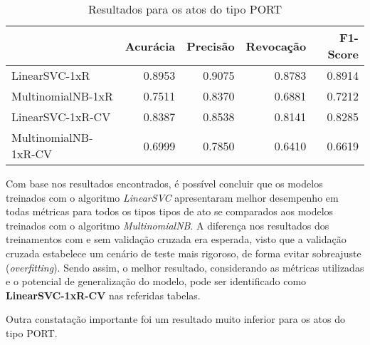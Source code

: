 \begin{table}[h]
\caption{Resultados para os atos do tipo PORT}
\label{tab:resultados-port}
	\begin{center}
	\begin{tabular}{lrrrr}
		\toprule
		{} &  Acurácia &  Precisão &  Revocação &      F1-Score \\
		\midrule
		LinearSVC-1xR        &    0.8953 &    0.9075 &     0.8783 &  0.8914 \\
		MultinomialNB-1xR    &    0.7511 &    0.8370 &     0.6881 &  0.7212 \\
		LinearSVC-1xR-CV     &    0.8387 &    0.8538 &     0.8141 &  0.8285 \\
		MultinomialNB-1xR-CV &    0.6999 &    0.7850 &     0.6410 &  0.6619 \\
		\bottomrule
	\end{tabular}
	\end{center}		
\end{table}

Com base nos resultados encontrados, é possível concluir que os modelos treinados com o algoritmo \textit{LinearSVC} apresentaram melhor desempenho em todas métricas para todos os tipos tipos de ato se comparados aos modelos treinados com o algoritmo \textit{MultinomialNB}. A diferença nos resultados dos treinamentos com e sem validação cruzada era esperada, visto que a validação cruzada estabelece um cenário de teste mais rigoroso, de forma evitar sobreajuste (\textit{overfitting}). Sendo assim, o melhor resultado, considerando as métricas utilizadas e o potencial de generalização do modelo, pode ser identificado como \textbf{LinearSVC-1xR-CV} nas referidas tabelas. 

Outra constatação importante foi um resultado muito inferior para os atos do tipo PORT.
